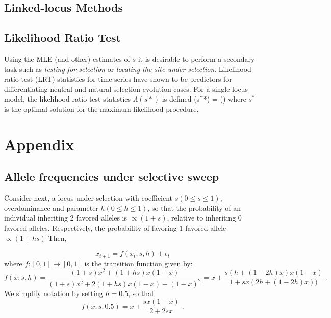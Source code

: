 \documentclass[11pt]{article}
\begin{document}
\begin{enumerate}[I.]
\subsection{Linked-locus Methods}

\subsection{Likelihood Ratio Test}
Using the MLE (and other) estimates of $s$ it is desirable to perform a 
secondary task such as \emph{testing for selection} or \emph{locating the 
site under selection}. Likelihood ratio test (LRT) statistics for time series 
\cite{feder2014Identifying} have shown to be predictors for differentiating
 neutral and  natural selection evolution cases. For a single locus model, the
  likelihood ratio 
test statistics $\Lambda(s*)$ is defined
\beq \label{eq:lrt}
\Lambda(s^*) = \log \left(\right)
\eeq
where $s^*$ is the optimal solution for the maximum-likelihood procedure. 

\newpage
\section{Appendix}
\subsection{Allele frequencies under selective sweep}
Consider next, a locus under selection with coefficient $s (0\le s\le
1)$, overdominance and parameter $h (0\le h\le 1)$, so that the
probability of an individual inheriting $2$ favored alleles is
$\propto (1+s)$, relative to inheriting $0$ favored
alleles. Respectively, the probability of favoring $1$ favored allele
$\propto (1+hs)$ Then,


\begin{equation}
x_{t+1} = f(x_t;s,h) + \epsilon_t
\label{eq:trans0} 
\end{equation}
where $f: [0,1] \mapsto [0,1]$ is the
transition function given by:
\begin{equation}
f(x;s,h)=\frac{(1+s)x^2 + (1+hs)x(1-x)}{(1+s)x^2 + 2(1+hs)x(1-x) + (1-x)^2}
=x+\frac{s(h+(1-2h)x)x(1-x)}{1+sx(2h+(1-2h)x))}\;.
\end{equation}
We simplify notation by setting $h=0.5$, so that
\begin{equation}
f(x;s,0.5)=x+\frac{sx(1-x)}{2+2sx}\;.
\label{eq:hequalshalf}
\end{equation}



\end{enumerate}
\end{document}
